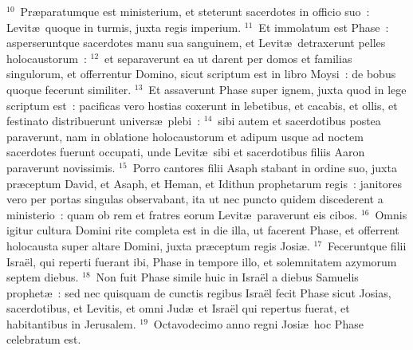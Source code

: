 ${}^{10}$~Pr\ae paratumque est ministerium, et steterunt sacerdotes in officio suo~: Levit\ae\ quoque in turmis, juxta regis imperium.
${}^{11}$~Et immolatum est Phase~: asperseruntque sacerdotes manu sua sanguinem, et Levit\ae\ detraxerunt pelles holocaustorum~:
${}^{12}$~et separaverunt ea ut darent per domos et familias singulorum, et offerrentur Domino, sicut scriptum est in libro Moysi~: de bobus quoque fecerunt similiter.
${}^{13}$~Et assaverunt Phase super ignem, juxta quod in lege scriptum est~: pacificas vero hostias coxerunt in lebetibus, et cacabis, et ollis, et festinato distribuerunt univers\ae\ plebi~:
${}^{14}$~sibi autem et sacerdotibus postea paraverunt, nam in oblatione holocaustorum et adipum usque ad noctem sacerdotes fuerunt occupati, unde Levit\ae\ sibi et sacerdotibus filiis Aaron paraverunt novissimis.
${}^{15}$~Porro cantores filii Asaph stabant in ordine suo, juxta pr\ae ceptum David, et Asaph, et Heman, et Idithun prophetarum regis~: janitores vero per portas singulas observabant, ita ut nec puncto quidem discederent a ministerio~: quam ob rem et fratres eorum Levit\ae\ paraverunt eis cibos.
${}^{16}$~Omnis igitur cultura Domini rite completa est in die illa, ut facerent Phase, et offerrent holocausta super altare Domini, juxta pr\ae ceptum regis Josi\ae .
${}^{17}$~Feceruntque filii Isra\"el, qui reperti fuerant ibi, Phase in tempore illo, et solemnitatem azymorum septem diebus.
${}^{18}$~Non fuit Phase simile huic in Isra\"el a diebus Samuelis prophet\ae~: sed nec quisquam de cunctis regibus Isra\"el fecit Phase sicut Josias, sacerdotibus, et Levitis, et omni Jud\ae\ et Isra\"el qui repertus fuerat, et habitantibus in Jerusalem.
${}^{19}$~Octavodecimo anno regni Josi\ae\ hoc Phase celebratum est.


